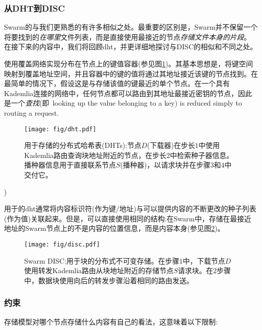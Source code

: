 \subsubsection{从DHT到DISC}
Swarm的与我们更熟悉的有许多相似之处。最重要的区别是，Swarm并不保留一个将要找到的\emph{在哪里}文件列表，而是直接使用最接近的节点\emph{存储文件本身的片段}。
在接下来的内容中，我们将回顾dht，并更详细地探讨与DISC的相似和不同之处。 
 
使用覆盖网络实现分布在节点上的键值容器(参见图\ref{fig:DHT})。其基本思想是，将键空间映射到覆盖地址空间，并且容器中的键的值将通过其地址接近该键的节点找到。在最简单的情况下，假设这是与存储该值的键最近的单个节点。在一个具有Kademlia连接的网络中，任何节点都可以路由到其地址最接近密钥的节点，因此是一个\emph{查找}(即\ looking up the value belonging to a key) is reduced simply to routing a request.\begin{figure}[htbp]
   \centering
   \texttt{[image: fig/dht.pdf]}
   \caption[分布式哈希表(dht) \statusgreen]{用于存储的分布式哈希表(DHTs):节点$D$(下载器)在步长$1$中使用Kademlia路由查询块地址附近的节点，在步长$2$中检索种子器信息。播种器信息用于直接联系节点$S$(播种器)，以请求块并在步骤$3$和$4$中交付它。}
   \label{fig:DHT}
\end{figure})

用于的dht通常将内容标识符(作为键/地址)与可以提供内容\cite{ipfs2014, crosby2007analysis}的不断更改的种子列表(作为值)关联起来。但是，可以直接使用相同的结构:在Swarm中，存储在最接近地址的Swarm节点上的不是内容的位置信息，而是内容本身(参见图\ref{fig:disc})。 


\begin{figure}[htbp]
   \centering
   \texttt{[image: fig/disc.pdf]}
   \caption[Swarm DISC:分布式不可变存储块\statusgreen]{Swarm DISC:用于块的分布式不可变存储。在步骤$1$中，下载节点$D$使用转发Kademlia路由从块地址附近的存储节点$S$请求块。在$2$步骤中，数据块使用向后的转发步骤沿着相同的路由发送。   }
   \label{fig:disc}
\end{figure}

\subsubsection{约束}
存储模型对哪个节点存储什么内容有自己的看法，这意味着以下限制: 

